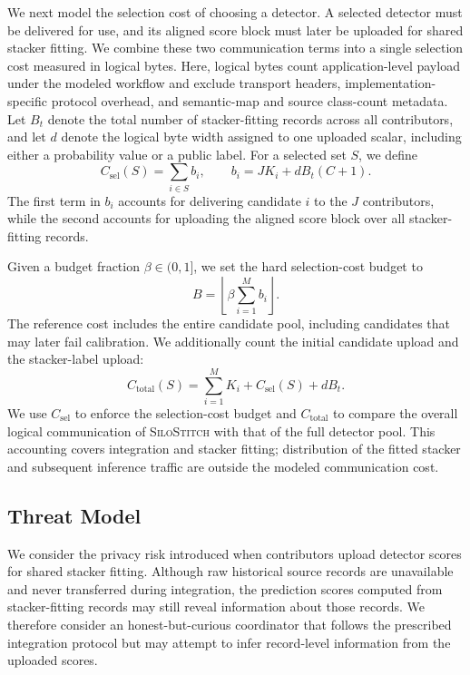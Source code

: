 \documentclass[conference]{IEEEtran}
\theoremstyle{definition}
\newcommand{\Fname}{\textsc{SiloStitch}\xspace}
\begin{document}
We next model the selection cost of choosing a detector.
A selected detector must be delivered for use, and its aligned score block must later be uploaded for shared stacker fitting.
We combine these two communication terms into a single selection cost measured in logical bytes.
Here, logical bytes count application-level payload under the modeled workflow and exclude transport headers, implementation-specific protocol overhead, and semantic-map and source class-count metadata.
Let $B_t$ denote the total number of stacker-fitting records across all contributors, and let $d$ denote the logical byte width assigned to one uploaded scalar, including either a probability value or a public label.
For a selected set $S$, we define
\begin{equation}
C_{\mathrm{sel}}(S)=\sum_{i\in S}b_i,
\qquad
b_i=J K_i+dB_t(C+1).
\label{eq:candidate_cost}
\end{equation}
The first term in $b_i$ accounts for delivering candidate $i$ to the $J$ contributors, while the second accounts for uploading the aligned score block over all stacker-fitting records.

Given a budget fraction $\beta\in(0,1]$, we set the hard selection-cost budget to
\begin{equation}
B=\left\lfloor\beta\sum_{i=1}^{M}b_i\right\rfloor.
\label{eq:logical_budget}
\end{equation}
The reference cost includes the entire candidate pool, including candidates that may later fail calibration.
We additionally count the initial candidate upload and the stacker-label upload:
\begin{equation}
C_{\mathrm{total}}(S)=\sum_{i=1}^{M}K_i+C_{\mathrm{sel}}(S)+dB_t.
\label{eq:total_logical_communication}
\end{equation}
We use $C_{\mathrm{sel}}$ to enforce the selection-cost budget and $C_{\mathrm{total}}$ to compare the overall logical communication of \Fname with that of the full detector pool.
This accounting covers integration and stacker fitting; distribution of the fitted stacker and subsequent inference traffic are outside the modeled communication cost.

\subsection{Threat Model}

We consider the privacy risk introduced when contributors upload detector scores for shared stacker fitting.
Although raw historical source records are unavailable and never transferred
during integration, the prediction scores computed from stacker-fitting
records may still reveal information about those records.
We therefore consider an honest-but-curious coordinator that follows the prescribed integration
protocol but may attempt to infer record-level information from the uploaded
scores.
\end{document}
